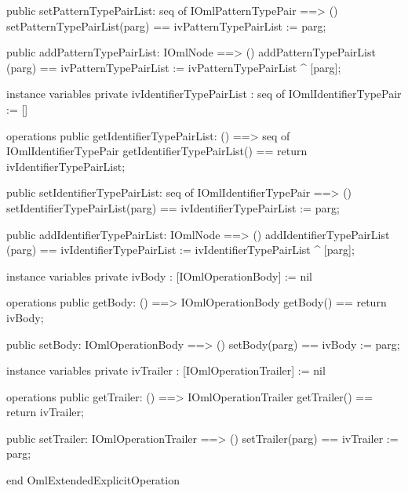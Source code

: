 \begin{vdm_al}
  public setPatternTypePairList: seq of IOmlPatternTypePair ==> ()
  setPatternTypePairList(parg) == ivPatternTypePairList := parg;

  public addPatternTypePairList: IOmlNode ==> ()
  addPatternTypePairList (parg) == ivPatternTypePairList := ivPatternTypePairList ^ [parg];

instance variables
  private ivIdentifierTypePairList : seq of IOmlIdentifierTypePair := []

operations
  public getIdentifierTypePairList: () ==> seq of IOmlIdentifierTypePair
  getIdentifierTypePairList() == return ivIdentifierTypePairList;

  public setIdentifierTypePairList: seq of IOmlIdentifierTypePair ==> ()
  setIdentifierTypePairList(parg) == ivIdentifierTypePairList := parg;

  public addIdentifierTypePairList: IOmlNode ==> ()
  addIdentifierTypePairList (parg) == ivIdentifierTypePairList := ivIdentifierTypePairList ^ [parg];

instance variables
  private ivBody : [IOmlOperationBody] := nil

operations
  public getBody: () ==> IOmlOperationBody
  getBody() == return ivBody;

  public setBody: IOmlOperationBody ==> ()
  setBody(parg) == ivBody := parg;

instance variables
  private ivTrailer : [IOmlOperationTrailer] := nil

operations
  public getTrailer: () ==> IOmlOperationTrailer
  getTrailer() == return ivTrailer;

  public setTrailer: IOmlOperationTrailer ==> ()
  setTrailer(parg) == ivTrailer := parg;

end OmlExtendedExplicitOperation
\end{vdm_al}

